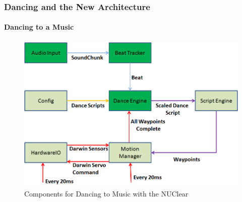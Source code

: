 \documentclass{beamer}
\begin{document}
	\begin{frame}
		\frametitle{Dancing and the New Architecture}
		\framesubtitle{Dancing to a Music}
		\begin{figure}
			\centering
			\includegraphics[scale=.45]{Presentation_Resources/dance_audio_new_arc_change.png}
			\caption{Components for Dancing to Music with the NUClear}
		\end{figure}
	\end{frame}	
\end{document}
